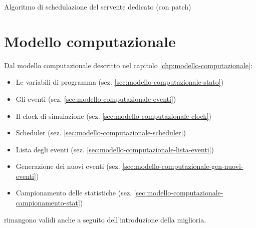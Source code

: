 \begin{algorithm}
\SetAlgoLined
{}
\caption{Algoritmo di schedulazione del servente dedicato (con {\color{purple}patch})}
\label{alg:miglioria-modello-specifiche-2}
\end{algorithm}

\section{Modello computazionale}\label{sec:miglioria-modello-computazionale}
Dal modello computazionale descritto nel capitolo \ref{chp:modello-computazionale}:
\begin{itemize}
\item Le variabili di programma (sez. \ref{sec:modello-computazionale-stato})
\item Gli eventi (sez. \ref{sec:modello-computazionale-eventi})
\item Il clock di simulazione (sez. \ref{sec:modello-computazionale-clock})
\item Scheduler (sez. \ref{sec:modello-computazionale-scheduler})
\item Lista degli eventi (sez. \ref{sec:modello-computazionale-lista-eventi})
\item Generazione dei nuovi eventi (sez. \ref{sec:modello-computazionale-gen-nuovi-eventi})
\item Campionamento delle statistiche (sez. \ref{sec:modello-computazionale-campionamento-stat})
\end{itemize}
rimangono validi anche a seguito dell'introduzione della miglioria.

